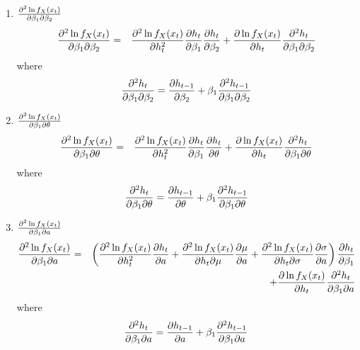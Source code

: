 \documentclass{book}
\begin{document}
\begin{enumerate}
\item $\partial^2 \ln f_X(x_t) \over \partial \beta_1 \partial \beta_2$
  \begin{eqnarray*}
    {\partial^2 \ln f_X(x_t) \over \partial \beta_1 \partial \beta_2}
    &=&
    {\partial^2 \ln f_X(x_t) \over \partial h_t^2}
    {\partial h_t \over \partial \beta_1}
    {\partial h_t \over \partial \beta_2}
    +
    {\partial \ln f_X(x_t) \over \partial h_t}
    {\partial^2 h_t \over \partial \beta_1 \partial \beta_2}
  \end{eqnarray*}
  where
  \begin{equation*}
    {\partial^2 h_t \over \partial \beta_1 \partial \beta_2} =
    {\partial h_{t-1} \over \partial \beta_2} +
    \beta_1 {\partial^2 h_{t-1} \over \partial \beta_1 \partial \beta_2}
  \end{equation*}

\item $\partial^2 \ln f_X(x_t) \over \partial \beta_1 \partial \theta$
  \begin{eqnarray*}
    {\partial^2 \ln f_X(x_t) \over \partial \beta_1 \partial \theta}
    &=&
    {\partial^2 \ln f_X(x_t) \over \partial h_t^2}
    {\partial h_t \over \partial \beta_1}
    {\partial h_t \over \partial \theta}
    +
    {\partial \ln f_X(x_t) \over \partial h_t}
    {\partial^2 h_t \over \partial \beta_1 \partial \theta}
  \end{eqnarray*}
  where
  \begin{equation*}
    {\partial^2 h_t \over \partial \beta_1 \partial \theta} =
    {\partial h_{t-1} \over \partial \theta} +
    \beta_1 {\partial^2 h_{t-1} \over \partial \beta_1 \partial \theta}
  \end{equation*}

\item $\frac{\partial^2 \ln f_X(x_t)}{\partial \beta_1 \partial a}$
  \begin{eqnarray*}
    \frac{\partial^2 \ln f_X(x_t)}{\partial \beta_1 \partial a}
    &=&
    \left(
      \frac{\partial^2 \ln f_X(x_t)}{\partial h_t^2} \frac{\partial h_t}{\partial a}
      + \frac{\partial^2 \ln f_X(x_t)}{\partial h_t \partial \mu} \frac{\partial \mu}{\partial a}
      + \frac{\partial^2 \ln f_X(x_t)}{\partial h_t \partial \sigma} \frac{\partial \sigma}{\partial a}
    \right) \frac{\partial h_t}{\partial \beta_1} \\
    &&
    + \frac{\partial \ln f_X(x_t)}{\partial h_t}
    \frac{\partial^2 h_t}{\partial \beta_1 \partial a}
  \end{eqnarray*}
  where
  \begin{equation*}
    {\partial^2 h_t \over \partial \beta_1 \partial a} =
    {\partial h_{t-1} \over \partial a} +
    \beta_1 {\partial^2 h_{t-1} \over \partial \beta_1 \partial a}
  \end{equation*}


\end{enumerate}
\end{document}
